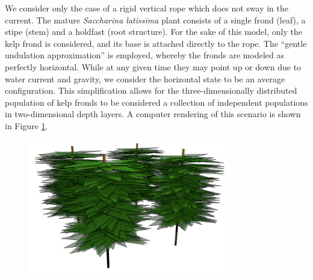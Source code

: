 \documentclass[ms,cpyr,lof,lot]{uathesis}
\begin{document}
We consider only the case of a rigid vertical rope which does not sway in the current.
The mature \textit{Saccharina latissima} plant consists of a single frond (leaf), a stipe (stem) and a holdfast (root structure).
For the sake of this model, only the kelp frond is considered, and its base is attached directly to the rope.
The ``gentle undulation approximation'' is employed, whereby the fronds are modeled as perfectly horizontal.
While at any given time they may point up or down due to water current and gravity, we consider the horizontal
state to be an average configuration.
This simplification allows for the three-dimensionally distributed population of kelp fronds
to be considered a collection of independent populations in two-dimensional depth layers.
A computer rendering of this scenario is shown in Figure \ref{fig:kelp_array}.

\begin{figure}[H]
	\centering
	\includegraphics[width=3.5in]{kelp_array}
  \label{fig:kelp_array}
\end{figure}
\end{document}
